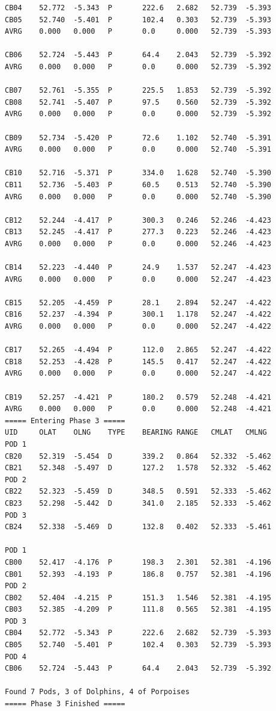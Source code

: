 \documentclass[10pt]{article}
\begin{document}
\begin{verbatim}
CB04    52.772  -5.343  P       222.6   2.682   52.739  -5.393
CB05    52.740  -5.401  P       102.4   0.303   52.739  -5.393
AVRG    0.000   0.000   P       0.0     0.000   52.739  -5.393

CB06    52.724  -5.443  P       64.4    2.043   52.739  -5.392
AVRG    0.000   0.000   P       0.0     0.000   52.739  -5.392

CB07    52.761  -5.355  P       225.5   1.853   52.739  -5.392
CB08    52.741  -5.407  P       97.5    0.560   52.739  -5.392
AVRG    0.000   0.000   P       0.0     0.000   52.739  -5.392

CB09    52.734  -5.420  P       72.6    1.102   52.740  -5.391
AVRG    0.000   0.000   P       0.0     0.000   52.740  -5.391

CB10    52.716  -5.371  P       334.0   1.628   52.740  -5.390
CB11    52.736  -5.403  P       60.5    0.513   52.740  -5.390
AVRG    0.000   0.000   P       0.0     0.000   52.740  -5.390

CB12    52.244  -4.417  P       300.3   0.246   52.246  -4.423
CB13    52.245  -4.417  P       277.3   0.223   52.246  -4.423
AVRG    0.000   0.000   P       0.0     0.000   52.246  -4.423

CB14    52.223  -4.440  P       24.9    1.537   52.247  -4.423
AVRG    0.000   0.000   P       0.0     0.000   52.247  -4.423

CB15    52.205  -4.459  P       28.1    2.894   52.247  -4.422
CB16    52.237  -4.394  P       300.1   1.178   52.247  -4.422
AVRG    0.000   0.000   P       0.0     0.000   52.247  -4.422

CB17    52.265  -4.494  P       112.0   2.865   52.247  -4.422
CB18    52.253  -4.428  P       145.5   0.417   52.247  -4.422
AVRG    0.000   0.000   P       0.0     0.000   52.247  -4.422

CB19    52.257  -4.421  P       180.2   0.579   52.248  -4.421
AVRG    0.000   0.000   P       0.0     0.000   52.248  -4.421
===== Entering Phase 3 =====
UID     OLAT    OLNG    TYPE    BEARING RANGE   CMLAT   CMLNG
POD 1
CB20    52.319  -5.454  D       339.2   0.864   52.332  -5.462
CB21    52.348  -5.497  D       127.2   1.578   52.332  -5.462
POD 2
CB22    52.323  -5.459  D       348.5   0.591   52.333  -5.462
CB23    52.298  -5.442  D       341.0   2.185   52.333  -5.462
POD 3
CB24    52.338  -5.469  D       132.8   0.402   52.333  -5.461

POD 1
CB00    52.417  -4.176  P       198.3   2.301   52.381  -4.196
CB01    52.393  -4.193  P       186.8   0.757   52.381  -4.196
POD 2
CB02    52.404  -4.215  P       151.3   1.546   52.381  -4.195
CB03    52.385  -4.209  P       111.8   0.565   52.381  -4.195
POD 3
CB04    52.772  -5.343  P       222.6   2.682   52.739  -5.393
CB05    52.740  -5.401  P       102.4   0.303   52.739  -5.393
POD 4
CB06    52.724  -5.443  P       64.4    2.043   52.739  -5.392

Found 7 Pods, 3 of Dolphins, 4 of Porpoises
===== Phase 3 Finished =====
            \end{verbatim}
\end{document}

